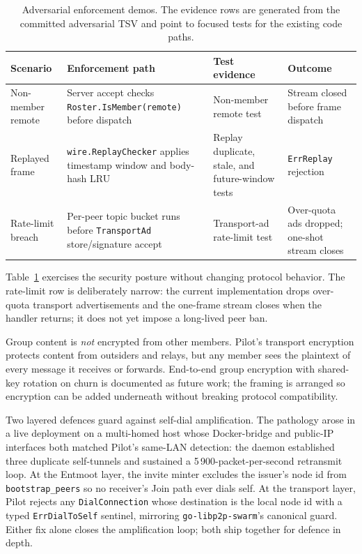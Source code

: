 \documentclass[11pt,a4paper,twocolumn]{article}
\begin{document}
\begin{table}[t]
\centering
\scriptsize
\caption{Adversarial enforcement demos. The evidence rows are generated from
the committed adversarial TSV and point to focused tests for the existing code
paths.}
\label{tab:adversarial-demos}
\begin{tabular}{p{}p{}p{}p{}}
\toprule
Scenario & Enforcement path & Test evidence & Outcome \\
\midrule
Non-member remote &
Server accept checks \texttt{Roster.IsMember(remote)} before dispatch &
Non-member remote test &
Stream closed before frame dispatch \\
Replayed frame &
\texttt{wire.ReplayChecker} applies timestamp window and body-hash LRU &
Replay duplicate, stale, and future-window tests &
\texttt{ErrReplay} rejection \\
Rate-limit breach &
Per-peer topic bucket runs before \texttt{TransportAd} store/signature accept &
Transport-ad rate-limit test &
Over-quota ads dropped; one-shot stream closes \\
\bottomrule
\end{tabular}
\end{table}

Table~\ref{tab:adversarial-demos} exercises the security posture without
changing protocol behavior. The rate-limit row is deliberately narrow: the
current implementation drops over-quota transport advertisements and the
one-frame stream closes when the handler returns; it does not yet impose a
long-lived peer ban.

Group content is \emph{not} encrypted from other members. Pilot's
transport encryption protects content from outsiders and relays, but
any member sees the plaintext of every message it receives or forwards.
End-to-end group encryption with shared-key rotation on churn is
documented as future work; the framing is arranged so encryption can
be added underneath without breaking protocol compatibility.

Two layered defences guard against self-dial amplification. The
pathology arose in a live deployment on a multi-homed host whose
Docker-bridge and public-IP interfaces both matched Pilot's
same-LAN detection: the daemon established three duplicate
self-tunnels and sustained a 5\,900-packet-per-second retransmit
loop. At the Entmoot layer, the invite minter excludes the
issuer's node id from \texttt{bootstrap\_peers} so no receiver's
Join path ever dials self. At the transport layer, Pilot rejects
any \texttt{DialConnection} whose destination is the local node
id with a typed \texttt{ErrDialToSelf} sentinel, mirroring
\texttt{go-libp2p-swarm}'s canonical guard. Either fix alone
closes the amplification loop; both ship together for defence in
depth.
\end{document}
